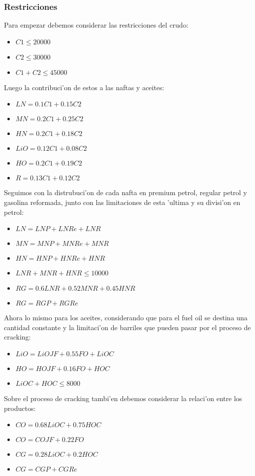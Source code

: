\subsubsection{Restricciones}
Para empezar debemos considerar las restricciones del crudo:
\begin{itemize}
\item$C1 \leq 20000$
\item$C2 \leq 30000$
\item$C1 + C2 \leq 45000$
\end{itemize}
Luego la contribuci'on de estos a las naftas y aceites:
\begin{itemize}
\item$LN = 0.1C1 + 0.15C2$
\item$MN = 0.2C1 + 0.25C2$
\item$HN = 0.2C1 + 0.18C2$
\item$LiO = 0.12C1 + 0.08C2$
\item$HO = 0.2C1 + 0.19C2$
\item$R = 0.13C1 + 0.12C2$
\end{itemize}
Seguimos con la distrubuci'on de cada nafta en premium petrol, regular petrol y gasolina reformada, junto con las limitaciones de esta 'ultima y su divisi'on en petrol:
\begin{itemize}
\item$LN = LNP + LNRe + LNR$
\item$MN = MNP + MNRe + MNR$
\item$HN = HNP + HNRe + HNR$
\item$LNR + MNR+ HNR \leq 10000$
\item$RG = 0.6LNR + 0.52MNR+ 0.45HNR$
\item$RG = RGP + RGRe$
\end{itemize}
Ahora lo mismo para los aceites, considerando que para el fuel oil se destina una cantidad constante y la limitaci'on de barriles que pueden pasar por el proceso de cracking:
\begin{itemize}
\item$LiO = LiOJF + 0.55FO + LiOC$
\item$HO = HOJF + 0.16FO + HOC$
\item$LiOC + HOC \leq 8000$
\end{itemize}
Sobre el proceso de cracking tambi'en debemos considerar la relaci'on entre los productos:
\begin{itemize}
\item$CO = 0.68LiOC + 0.75HOC$
\item$CO = COJF + 0.22FO$
\item$CG = 0.28LiOC + 0.2HOC$
\item$CG = CGP + CGRe$
\end{itemize}
